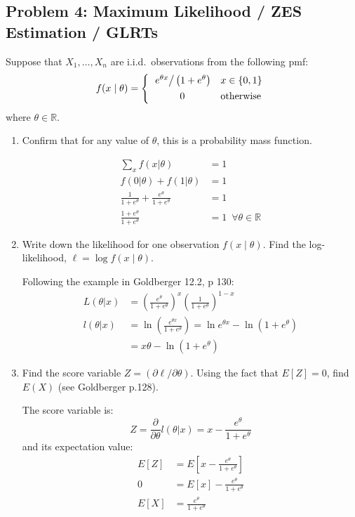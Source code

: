 \documentclass{article}
\newcommand{\field}[1]{\mathbb{#1}}
\newcommand{\1}{\mathbf{1}}
\newcommand{\R}{\field{R}} %
\begin{document}
\subsection*{Problem 4: Maximum Likelihood / ZES Estimation / GLRTs}
Suppose that $X_1,\ldots ,X_n$ are i.i.d.~observations from the following pmf:
$$ f(x \mid \theta)  = \left\{\begin{array}{cl}
        \left. e^{\theta x}\right/\left(1+e^{\theta}\right) & x \in \{0,1\} \\[4pt]
        0 & \hbox{otherwise}
        \end{array}
        \right.
$$
where $\theta \in \mathbb{R}$.
\begin{enumerate}
    \item Confirm that for any value of $\theta$, this is a probability mass function.
    
    \begin{align*}
        \sum_x f(x|\theta) &= 1 \\
        f(0|\theta) + f(1|\theta) &= 1\\
        \frac{1}{1+e^\theta}  + \frac{e^\theta}{1+e^\theta} &= 1 \\
        \frac{1+e^\theta}{1+e^\theta} &= 1 \,\,\, \forall \theta \in \R
    \end{align*}
    
    \item Write down the likelihood for one observation $f(x \mid \theta)$. Find the log-likelihood, $\ell = \log f(x \mid \theta)$.
    
    Following the example in Goldberger 12.2, p 130:
    \begin{align*}
        L(\theta |x) &= \left(\frac{e^\theta}{1+e^\theta}\right)^x \left(\frac{1}{1+e^\theta}\right)^{1-x} \\
        l(\theta|x) &= \ln{\left( \frac{e^{\theta x}}{1+e^\theta}   \right)} = \ln{e^{\theta x}} - \ln{(1+e^\theta)} \\
        &= x\theta - \ln{(1+e^\theta)}
    \end{align*}
    
    \item Find the score variable $Z = ({\partial\ell / \partial \theta})$. Using the fact that $E[Z]=0$, find $E(X)$ (see Goldberger p.128). 
    
    The score variable is:
    $$Z = \frac{\partial}{\partial\theta} l(\theta | x) = x - \frac{e^\theta}{1+e^\theta} $$
    and its expectation value:
    \begin{align*}
        E[Z] &= E\left[ x - \frac{e^\theta}{1+e^\theta} \right] \\
        0 &= E[x] - \frac{e^\theta}{1+e^\theta} \\
        E[X] &= \frac{e^\theta}{1+e^\theta}
    \end{align*}
    

\end{enumerate}
\end{document}
